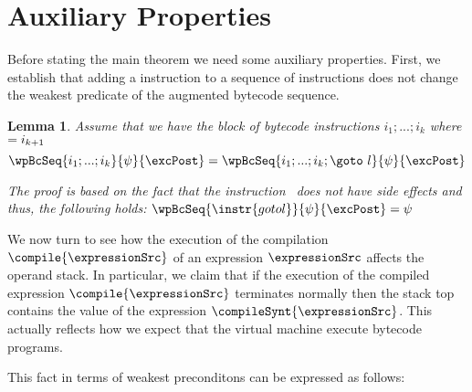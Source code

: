 

\newtheorem{interProp}{Lemma} %

\newtheorem{exprValueOnStack}[interProp]{Lemma}
\newtheorem{stackCounter}[interProp]{Lemma}
\newtheorem{dupProp}[interProp]{Lemma}
\newtheorem{newProp}[interProp]{Lemma}


\section{Auxiliary Properties}

Before stating the main theorem we need some auxiliary properties.
 First, we establish that adding a  instruction  to a sequence of instructions does not change the weakest predicate of the
 augmented bytecode sequence.  


\begin{interProp} \label{interProp}
Assume that we have the block of bytecode instructions $i_1;...;i_k$ where $ \next{i_k} = i_{k+1}$
     $$ \wpBcSeq{ i_1;...;i_k}{ \psi  }  { \excPost } = 
\wpBcSeq{i_1;...;i_k; \goto \  l }{\psi }{\excPost} $$

The proof is based on the fact that the instruction \goto \ does not have side effects and thus,
the following holds: $ \wpBcSeq{ \instr{goto l}}{\psi}{\excPost} = \psi $
\end{interProp}


We now turn to see how the execution of the compilation  $\compile{\expressionSrc}$ of an expression 
$\expressionSrc$ affects the operand stack. In particular, we claim that if the execution of the compiled expression 
 $\compile{\expressionSrc}$ terminates normally then the stack top contains the value of the expression $\compileSynt{\expressionSrc}$.
This actually reflects how we expect that the virtual machine execute bytecode programs.

 This fact in terms of weakest 
preconditons can be expressed as follows: 

